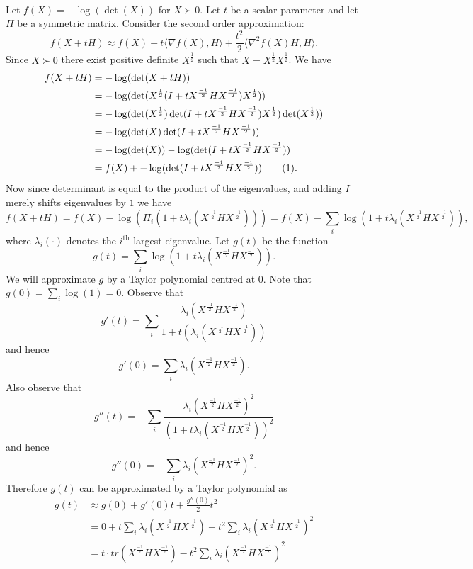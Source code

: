 \documentclass[letterpaper,12pt,oneside,onecolumn]{article}
\newcommand{\1}{\mathbbm{1}}
\newcommand\numberthis{\addtocounter{equation}{1}\tag{\theequation}}
\begin{document}
\paragraph{}
Let $f(X) = -\log(\det(X))$ for $X \succ 0$. Let $t$ be a scalar parameter and let $H$ be a symmetric matrix. Consider the second order approximation:
\begin{equation}f(X + tH) \approx f(X) + t\langle \nabla f(X), H \rangle + \frac{t^2}{2}\langle \nabla^2f(X)H, H\rangle.\label{eq:soa}\end{equation}
Since $X \succ 0$ there exist positive definite $X^\frac{1}{2}$ such that $X = X^\frac{1}{2}X^\frac{1}{2}$. We have
\begin{align*}
f(X + tH) &= -\log(\det(X + tH)) \\
&= -\log(\det(X^\frac{1}{2}(I + tX^\frac{-1}{2}HX^\frac{-1}{2})X^\frac{1}{2})) \\
&= -\log(\det(X^\frac{1}{2})\det(I + tX^\frac{-1}{2}HX^\frac{-1}{2})X^\frac{1}{2})\det(X^\frac{1}{2}))\\
&=-\log(\det(X)\det(I + tX^\frac{-1}{2}HX^\frac{-1}{2})) \\
&=-\log(\det(X)) -\log(\det(I + tX^\frac{-1}{2}HX^\frac{-1}{2}))\\
&= f(X) + -\log(\det(I + tX^\frac{-1}{2}HX^\frac{-1}{2})) \label{eq:taylor} \numberthis.
\end{align*}
Now since determinant is equal to the product of the eigenvalues, and adding $I$ merely shifts eigenvalues by $1$ we have
$$f(X+tH) = f(X) -\log(\Pi_{i}(1+t\lambda_i(X^\frac{-1}{2}HX^\frac{-1}{2}))) = f(X) -\sum_i \log(1+t\lambda_i(X^\frac{-1}{2}HX^\frac{-1}{2})),$$
where $\lambda_i(\cdot)$ denotes the $i^\text{th}$ largest eigenvalue. Let $g(t)$ be the function
$$g(t) = \sum_i \log(1+t\lambda_i(X^\frac{-1}{2}HX^\frac{-1}{2})).$$
We will approximate $g$ by a Taylor polynomial centred at $0$. Note that $g(0) = \sum_i \log(1) = 0$. Observe that
$$g'(t) = \sum_{i}\frac{\lambda_i(X^\frac{-1}{2}HX^\frac{-1}{2})}{1 + t(\lambda_i(X^\frac{-1}{2}HX^\frac{-1}{2}))}$$
and hence
$$g'(0) = \sum_{i} \lambda_i(X^\frac{-1}{2}HX^\frac{-1}{2}).$$
Also observe that
$$g''(t) = -\sum_{i} \frac{\lambda_i(X^\frac{-1}{2}HX^\frac{-1}{2})^2}{(1+t\lambda_i(X^\frac{-1}{2}HX^\frac{-1}{2}))^2}$$
and hence
$$g''(0)  = -\sum_{i} \lambda_i(X^\frac{-1}{2}HX^\frac{-1}{2})^2.$$
Therefore $g(t)$ can be approximated by a Taylor polynomial as
\begin{align*}g(t) &\approx g(0) + g'(0)t + \frac{g''(0)}{2} t^2 \\
&= 0 + t\sum_{i} \lambda_i(X^\frac{-1}{2}HX^\frac{-1}{2}) - t^2 \sum_{i} \lambda_i(X^\frac{-1}{2}HX^\frac{-1}{2})^2 \\
&= t\cdot tr(X^\frac{-1}{2}HX^\frac{-1}{2}) -t^2 \sum_i\lambda_i(X^\frac{-1}{2}HX^\frac{-1}{2})^2
\end{align*}
\end{document}

